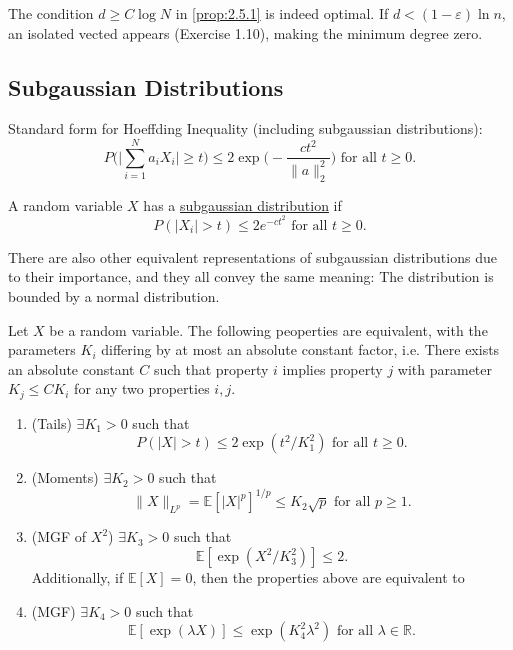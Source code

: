 \begin{remark}
The condition $d \geq C \log{N}$ in \cref{prop:2.5.1} is indeed optimal. If $d < (1 - \varepsilon) \ln{n}$, 
an isolated vected appears (Exercise 1.10), making the minimum degree zero.
\end{remark}



\subsection{Subgaussian Distributions}
Standard form for Hoeffding Inequality (including subgaussian distributions): 
\[ P \biggl( \bigg| \sum_{i = 1}^{N} a_i X_i \bigg| \geq t \biggr) \leq 
2 \exp{\biggl( -\frac{ct^2}{\|a\|_2^2} \biggr)} \text{ for all } t \geq 0. \]

A random variable $X$ has a \underline{subgaussian distribution} if 
\[ P(|X_i| > t) \leq 2e^{-ct^2} \text{ for all } t \geq 0. \]

There are also other equivalent representations of subgaussian distributions due to their importance, and 
they all convey the same meaning: The distribution is bounded by a normal distribution. 

\begin{proposition}
\label{prop:2.6.1}
Let $X$ be a random variable. The following peoperties are equivalent, with the parameters $K_i$ differing 
by at most an absolute constant factor, i.e. There exists an absolute constant $C$ such that property $i$ 
implies property $j$ with parameter $K_j \leq CK_i$ for any two properties $i, j$.
\begin{enumerate}
	\item (Tails) $\exists K_1 > 0$ such that 
	\[ P(|X| > t) \leq 2\exp{(t^2 / K_1^2)} \text{ for all } t \geq 0. \]
	\item (Moments) $\exists K_2 > 0$ such that 
	\[ \|X\|_{L^p} = \mathbb{E}[|X|^p]^{1/p} \leq K_2 \sqrt{p} \text{ for all } p \geq 1. \]
	\item (MGF of $X^2$) $\exists K_3 > 0$ such that 
	\[ \mathbb{E}[\exp{(X^2 / K_3^2)}] \leq 2. \]
	Additionally, if $\mathbb{E}[X] = 0$, then the properties above are equivalent to 
	\item (MGF) $\exists K_4 > 0$ such that 
	\[ \mathbb{E}[\exp{(\lambda X)}] \leq \exp{(K_4^2 \lambda^2)} \text{ for all } \lambda \in \mathbb{R}. \]
\end{enumerate}
\end{proposition}

